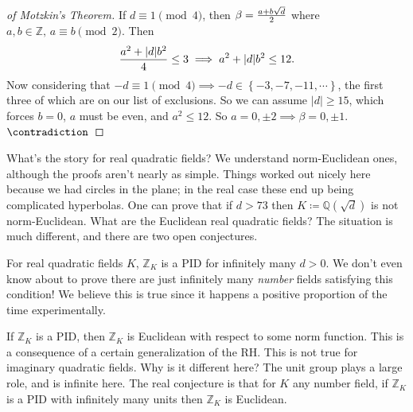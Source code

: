\begin{proof}[of Motzkin's Theorem]
If \(d \equiv 1 \pmod 4\), then \(\beta= {a + b \sqrt{d} \over 2}\)
where \(a,b\in {\mathbb{Z}},\, a\equiv b \pmod 2\). Then
\begin{align*}
{a^2 + {\left\lvert {d} \right\rvert}b^2 \over 4} \leq 3 \implies a^2 + {\left\lvert {d} \right\rvert}b^2 \leq 12  
.\end{align*}
Now considering that
\(-d\equiv 1 \pmod 4 \implies -d \in \left\{{ -3, -7, -11, \cdots}\right\}\),
the first three of which are on our list of exclusions. So we can assume
\({\left\lvert {d} \right\rvert}\geq 15\), which forces \(b=0\), \(a\)
must be even, and \(a^2 \leq 12\). So
\(a=0, \pm 2 \implies \beta= 0, \pm 1\). \(\contradiction\)

\end{proof}

\begin{remark}

What's the story for real quadratic fields? We understand norm-Euclidean
ones, although the proofs aren't nearly as simple. Things worked out
nicely here because we had circles in the plane; in the real case these
end up being complicated hyperbolas. One can prove that if \(d > 73\)
then \(K \coloneqq{\mathbb{Q}}(\sqrt d)\) is not norm-Euclidean. What
are the Euclidean real quadratic fields? The situation is much
different, and there are two open conjectures.

\end{remark}

\begin{conjecture}

For real quadratic fields \(K\), \({\mathbb{Z}}_K\) is a PID for
infinitely many \(d> 0\). We don't even know about to prove there are
just infinitely many \emph{number} fields satisfying this condition! We
believe this is true since it happens a positive proportion of the time
experimentally.

\end{conjecture}

\begin{conjecture}

If \({\mathbb{Z}}_K\) is a PID, then \({\mathbb{Z}}_K\) is Euclidean
with respect to some norm function. This is a consequence of a certain
generalization of the RH. This is not true for imaginary quadratic
fields. Why is it different here? The unit group plays a large role, and
is infinite here. The real conjecture is that for \(K\) any number
field, if \({\mathbb{Z}}_K\) is a PID with infinitely many units then
\({\mathbb{Z}}_K\) is Euclidean.

\end{conjecture}

